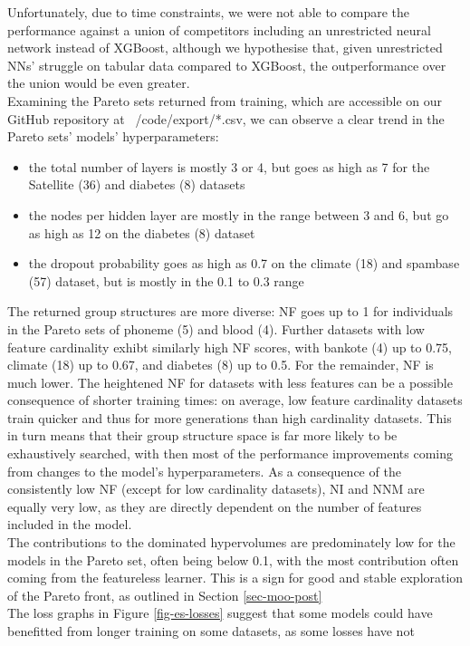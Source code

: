 \documentclass[twoside,11pt]{article}
\begin{document}
Unfortunately, due to time constraints, we were not able to compare the performance against a union of competitors including an unrestricted neural network
instead of XGBoost, although we hypothesise that, given unrestricted NNs' struggle on tabular data compared to XGBoost, the outperformance over the union would
be even greater.
\\
Examining the Pareto sets returned from training, which are accessible on our GitHub repository at ~/code/export/*.csv, we can observe a clear trend in the
Pareto sets' models' hyperparameters:
\begin{itemize}
  \item the total number of layers is mostly 3 or 4, but goes as high as 7 for the Satellite (36) and diabetes (8) datasets
  \item the nodes per hidden layer are mostly in the range between 3 and 6, but go as high as 12 on the diabetes (8) dataset
  \item the dropout probability goes as high as 0.7 on the climate (18) and spambase (57) dataset, but is mostly in the 0.1 to 0.3 range
\end{itemize}
The returned group structures are more diverse:
NF goes up to 1 for individuals in the Pareto sets of phoneme (5) and blood (4). Further datasets with low feature cardinality exhibt similarly high
NF scores, with bankote (4) up to 0.75, climate (18) up to 0.67, and diabetes (8) up to 0.5. For the remainder, NF is much lower. The heightened NF for
datasets with less features can be a possible consequence of shorter training times: on average, low feature cardinality datasets train quicker and thus
for more generations than high cardinality datasets. This in turn means that their group structure space is far more likely to be exhaustively searched,
with then most of the performance improvements coming from changes to the model's hyperparameters.
As a consequence of the consistently low NF (except for low cardinality datasets), NI and NNM are equally very low, as they are directly dependent on the
number of features included in the model.
\\
The contributions to the dominated hypervolumes are predominately low for the models in the Pareto set, often being below 0.1, with the most contribution
often coming from the featureless learner. This is a sign for good and stable exploration of the Pareto front, as outlined in Section \ref{sec-moo-post}
\\
The loss graphs in Figure \ref{fig-es-losses} suggest that some models could have benefitted from longer training on some datasets, as some losses have not
\end{document}
